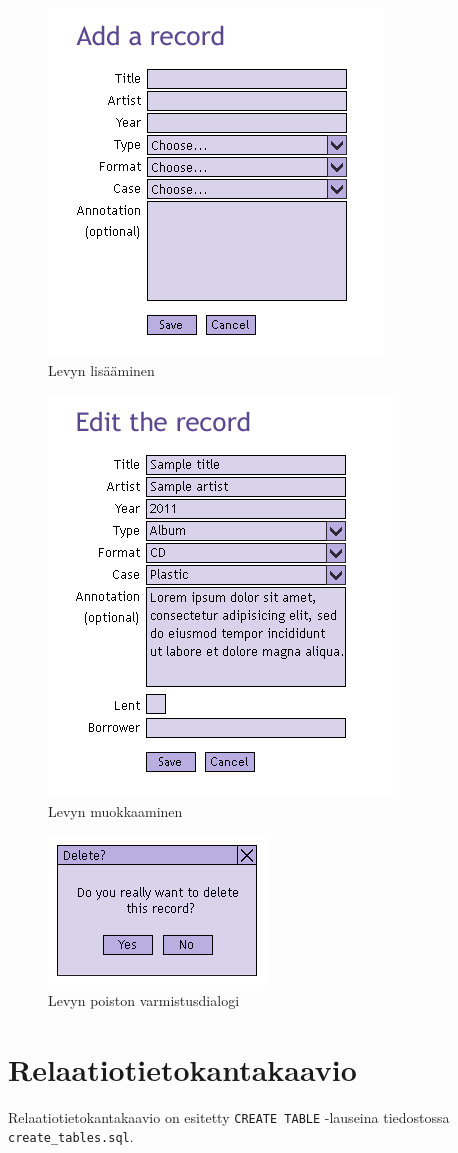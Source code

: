 \documentclass[a4paper,12pt]{report}
\begin{document}
\begin{figure}[H]
\begin{center}
\includegraphics[]{addpage}
\end{center}
\caption{Levyn lisääminen}
\end{figure}

\begin{figure}[H]
\begin{center}
\includegraphics[]{editpage}
\end{center}
\caption{Levyn muokkaaminen}
\end{figure}

\begin{figure}[H]
\begin{center}
\includegraphics[]{delete}
\end{center}
\caption{Levyn poiston varmistusdialogi}
\end{figure}

\section{Relaatiotietokantakaavio}

Relaatiotietokantakaavio on esitetty \texttt{CREATE TABLE} -lauseina tiedostossa
\texttt{create\_tables.sql}.
\end{document}

